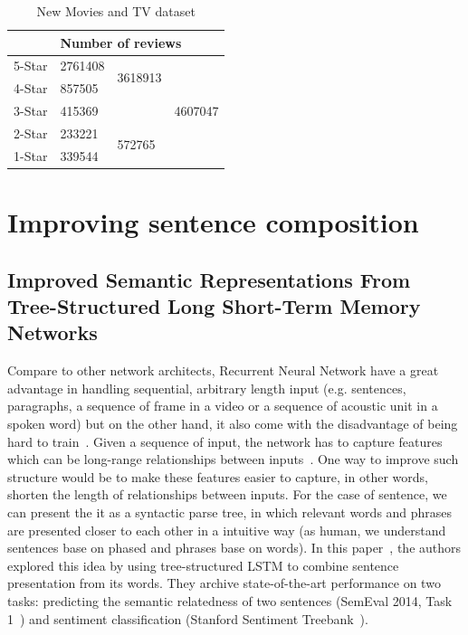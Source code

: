 \begin{table}[H]
	\centering
	\caption{New Movies and TV dataset}
	\label{table:moviereview}
	\begin{tabular}{@{}lllc@{}}
		\toprule
		& \multicolumn{3}{l}{Number of reviews}                         \\ \midrule
		5-Star & 2761408 & \multirow{2}{*}{3618913} & \multirow{5}{*}{4607047} \\ \cmidrule(r){1-2}
		4-Star & 857505  &                          &                          \\ \cmidrule(r){1-3}
		3-Star & \multicolumn{2}{l}{415369}         &                          \\ \cmidrule(r){1-3}
		2-Star & 233221  & \multirow{2}{*}{572765}  &                          \\ \cmidrule(r){1-2}
		1-Star & 339544  &                          &                          \\ \bottomrule
	\end{tabular}
\end{table}


\section{Improving sentence composition}


\subsection{Improved Semantic Representations From Tree-Structured Long Short-Term Memory Networks}
Compare to other network architects, Recurrent Neural Network have a great advantage in handling sequential, arbitrary length input (e.g. sentences, paragraphs, a sequence of frame in a video or a sequence of acoustic unit in a spoken word) but on the other hand, it also come with the disadvantage of being hard to train~\cite{hardRNN}.
Given a sequence of input, the network has to capture features which can be long-range relationships between inputs~\cite{socher2013recursive}.
One way to improve such structure would be to make these features easier to capture, in other words, shorten the length of relationships between inputs.
For the case of sentence, we can present the it as a syntactic parse tree, in which relevant words and phrases are presented closer to each other in a intuitive way (as human, we understand sentences base on phased and phrases base on words). 
In this paper~\cite{treeLSTM}, the authors explored this idea by using tree-structured LSTM to combine sentence presentation from its words.
They archive state-of-the-art performance on two tasks: predicting the semantic relatedness of two sentences (SemEval 2014, Task 1~\cite{SemeEvalTask1}) and sentiment classification (Stanford Sentiment Treebank~\cite{socher2013recursive}).


